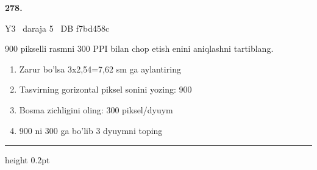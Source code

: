 \documentclass[10pt,a4paper,oneside]{article}
\begin{document}
\hypertarget{q278}{\textbf{\color{ink}278.}}  {\color{muted}\scriptsize Y3 \textbullet\ daraja 5 \textbullet\ DB f7bd458c}
\par
900 pikselli rasmni 300 PPI bilan chop etish enini aniqlashni tartiblang.
\begin{enumerate}[label=\Alph*),leftmargin=9mm]
\item Zarur bo'lsa 3x2,54=7,62 sm ga aylantiring
\item Tasvirning gorizontal piksel sonini yozing: 900
\item Bosma zichligini oling: 300 piksel/dyuym
\item 900 ni 300 ga bo'lib 3 dyuymni toping
\end{enumerate}
\vspace{2mm}\hrule height 0.2pt \vspace{4mm}
\end{document}
